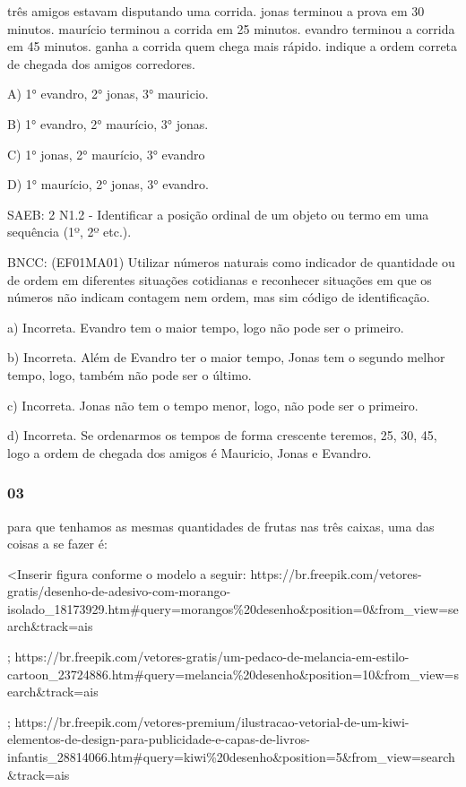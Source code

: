 três amigos estavam disputando uma corrida. jonas terminou a prova em 30
minutos. maurício terminou a corrida em 25 minutos. evandro terminou a
corrida em 45 minutos. ganha a corrida quem chega mais rápido. indique a
ordem correta de chegada dos amigos corredores.

A) 1° evandro, 2° jonas, 3° mauricio.

B) 1° evandro, 2° maurício, 3° jonas.

C) 1° jonas, 2° maurício, 3° evandro

D) 1° maurício, 2° jonas, 3° evandro.

SAEB: 2 N1.2 - Identificar a posição ordinal de um objeto ou termo em
uma sequência (1º, 2º etc.).

BNCC: (EF01MA01) Utilizar números naturais como indicador de quantidade
ou de ordem em diferentes situações cotidianas e reconhecer situações em
que os números não indicam contagem nem ordem, mas sim código de
identificação.

a) Incorreta. Evandro tem o maior tempo, logo não pode ser o primeiro.

b) Incorreta. Além de Evandro ter o maior tempo, Jonas tem o segundo
melhor tempo, logo, também não pode ser o último.

c) Incorreta. Jonas não tem o tempo menor, logo, não pode ser o
primeiro.

d) Incorreta. Se ordenarmos os tempos de forma crescente teremos, 25,
30, 45, logo a ordem de chegada dos amigos é Mauricio, Jonas e Evandro.

\subsubsection{03}\label{section-134}

para que tenhamos as mesmas quantidades de frutas nas três caixas, uma
das coisas a se fazer é:

\textless{}Inserir figura conforme o modelo a seguir:
https://br.freepik.com/vetores-gratis/desenho-de-adesivo-com-morango-isolado\_18173929.htm\#query=morangos\%20desenho\&position=0\&from\_view=search\&track=ais

;
https://br.freepik.com/vetores-gratis/um-pedaco-de-melancia-em-estilo-cartoon\_23724886.htm\#query=melancia\%20desenho\&position=10\&from\_view=search\&track=ais

;
https://br.freepik.com/vetores-premium/ilustracao-vetorial-de-um-kiwi-elementos-de-design-para-publicidade-e-capas-de-livros-infantis\_28814066.htm\#query=kiwi\%20desenho\&position=5\&from\_view=search\&track=ais

